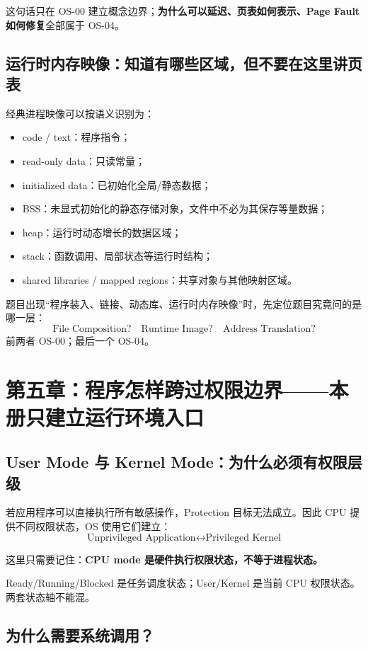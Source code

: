 \documentclass[11pt,a4paper]{ctexart}
\newcommand{\kw}[1]{\textbf{#1}}
\begin{document}
这句话只在 OS-00 建立概念边界；\kw{为什么可以延迟、页表如何表示、Page Fault 如何修复}全部属于 OS-04。

\subsection{运行时内存映像：知道有哪些区域，但不要在这里讲页表}

经典进程映像可以按语义识别为：
\begin{itemize}
  \item code / text：程序指令；
  \item read-only data：只读常量；
  \item initialized data：已初始化全局/静态数据；
  \item BSS：未显式初始化的静态存储对象，文件中不必为其保存等量数据；
  \item heap：运行时动态增长的数据区域；
  \item stack：函数调用、局部状态等运行时结构；
  \item shared libraries / mapped regions：共享对象与其他映射区域。
\end{itemize}

\begin{exam}[考试第一动作]
题目出现“程序装入、链接、动态库、运行时内存映像”时，先定位题目究竟问的是哪一层：
\[
\boxed{\text{File Composition?}\quad\text{Runtime Image?}\quad\text{Address Translation?}}
\]
前两者 OS-00；最后一个 OS-04。
\end{exam}

\section{第五章：程序怎样跨过权限边界——本册只建立运行环境入口}

\subsection{User Mode 与 Kernel Mode：为什么必须有权限层级}

若应用程序可以直接执行所有敏感操作，Protection 目标无法成立。因此 CPU 提供不同权限状态，OS 使用它们建立：
\[
\boxed{\text{Unprivileged Application}\leftrightarrow\text{Privileged Kernel}}
\]

这里只需要记住：\kw{CPU mode 是硬件执行权限状态，不等于进程状态。}

Ready/Running/Blocked 是任务调度状态；User/Kernel 是当前 CPU 权限状态。两套状态轴不能混。

\subsection{为什么需要系统调用？}
\end{document}
